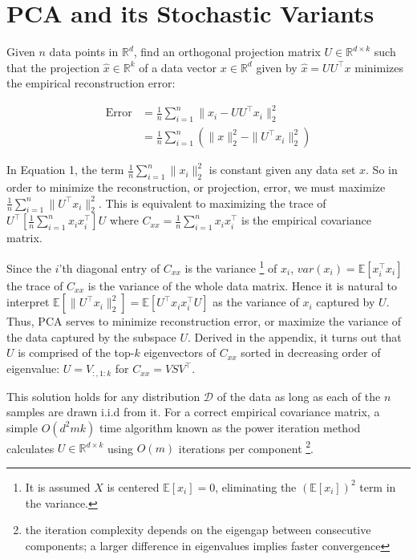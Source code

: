 \documentclass[11pt,letterpaper]{article}
\begin{document}
\section{PCA and its Stochastic Variants}

Given $n$ data points in $\mathbb{R}^d$, find an orthogonal projection matrix $U \in \mathbb{R}^{d \times k}$ such that the projection $\hat{x} \in \mathbb{R}^k$ of a data vector $x \in \mathbb{R}^{d}$ given by $\hat{x}=UU^\top x$ minimizes the empirical reconstruction error:

\begin{equation}
\begin{aligned}
\text{Error} &= \frac{1}{n} \sum_{i=1}^n \| x_i-UU^\top x_i \|^2_2 \\
&=\frac{1}{n}\sum_{i=1}^n \left(\|x\|_2^2- \|U^\top x_i\|_2^2 \right)
\end{aligned}
\end{equation}

In Equation 1, the term $\frac{1}{n} \sum_{i=1}^n \| x_i \|^2_2$ is constant given any data set $x$. So in order to minimize the reconstruction, or projection, error, we must maximize $\frac{1}{n} \sum_{i=1}^n \|U^\top x_i\|_2^2$. This is equivalent to maximizing the trace of $U^\top {\left[\displaystyle \frac{1}{n} \sum_{i=1}^n x_i x_i^\top \right]} U$ where $C_{xx} = \frac{1}{n} \sum_{i=1}^n x_i x_i^\top $ is the empirical covariance matrix.

Since the $i$'th diagonal entry of $C_{xx}$ is the variance \footnote{It is assumed $X$ is centered $\mathbb{E}[x_i] = 0$, eliminating the $(\mathbb{E}[x_i])^2$ term in the variance.} of $x_i$, $var(x_i) = \mathbb{E}[x_i^{\top} x_i]$ the trace of $C_{xx}$ is the variance of the whole data matrix. Hence it is natural to interpret $ \mathbb{E}[\|U^\top x_i\|_2^2] =  \mathbb{E}[U^\top x_ix_i^{\top}U]$ as the variance of $x_i$ captured by $U$. Thus, PCA serves to minimize reconstruction error, or maximize the variance of the data captured by the subspace $U$. Derived in the appendix, it turns out that $U$ is comprised of the top-$k$ eigenvectors of $C_{xx}$ sorted in decreasing order of eigenvalue: $U = V_{:, 1:k}$ for $C_{xx} = VSV^{\top}$. 

This solution holds for any distribution $\mathcal{D}$ of the data as long as each of the $n$ samples are drawn i.i.d from it. For a correct empirical covariance matrix, a simple $O(d^2mk)$ time algorithm known as the power iteration method calculates $U \in \mathbb{R}^{d \times k}$ using $O(m)$ iterations per component \footnote{the iteration complexity depends on the eigengap between consecutive components; a larger difference in eigenvalues implies faster convergence}. 
\end{document}
